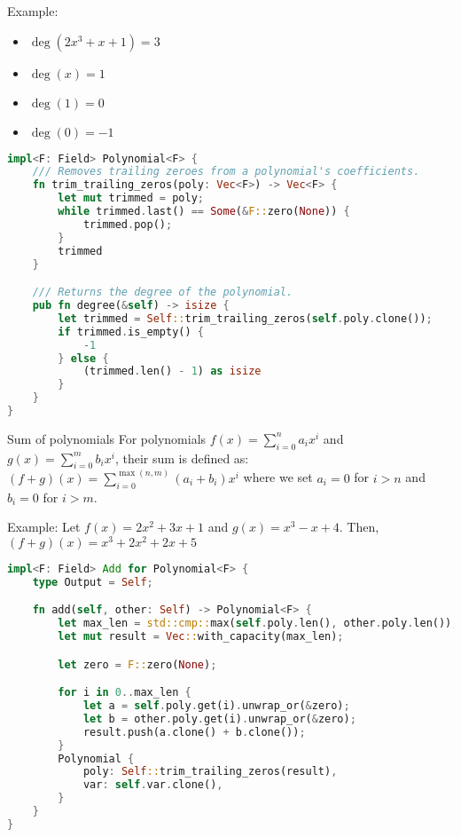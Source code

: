 \documentclass{article}
\begin{document}
Example: 

\begin{itemize}
    \item $\deg(2x^3 + x + 1) = 3$
    \item $\deg(x) = 1$
    \item $\deg(1) = 0$
    \item $\deg(0) = -1$
\end{itemize}

\begin{lstlisting}[language=Rust, caption=Degree of Polynomials]
impl<F: Field> Polynomial<F> {
    /// Removes trailing zeroes from a polynomial's coefficients.
    fn trim_trailing_zeros(poly: Vec<F>) -> Vec<F> {
        let mut trimmed = poly;
        while trimmed.last() == Some(&F::zero(None)) {
            trimmed.pop();
        }
        trimmed
    }

    /// Returns the degree of the polynomial.
    pub fn degree(&self) -> isize {
        let trimmed = Self::trim_trailing_zeros(self.poly.clone());
        if trimmed.is_empty() {
            -1
        } else {
            (trimmed.len() - 1) as isize
        }
    }
}
\end{lstlisting}

\begin{definition}{Sum of polynomials}{}
    For polynomials $f(x) = \sum_{i=0}^n a_i x^i$ and $g(x) = \sum_{i=0}^m b_i x^i$, their sum is defined as:
    $(f + g)(x) = \sum_{i=0}^{\max(n,m)} (a_i + b_i) x^i$
    where we set $a_i = 0$ for $i > n$ and $b_i = 0$ for $i > m$.
\end{definition}

Example: Let $f(x) = 2x^2 + 3x + 1$ and $g(x) = x^3 - x + 4$. Then, $(f + g)(x) = x^3 + 2x^2 + 2x + 5$

\begin{lstlisting}[language=Rust, caption=Sum of Polynomials]
impl<F: Field> Add for Polynomial<F> {
    type Output = Self;

    fn add(self, other: Self) -> Polynomial<F> {
        let max_len = std::cmp::max(self.poly.len(), other.poly.len());
        let mut result = Vec::with_capacity(max_len);

        let zero = F::zero(None);

        for i in 0..max_len {
            let a = self.poly.get(i).unwrap_or(&zero);
            let b = other.poly.get(i).unwrap_or(&zero);
            result.push(a.clone() + b.clone());
        }
        Polynomial {
            poly: Self::trim_trailing_zeros(result),
            var: self.var.clone(),
        }
    }
}
\end{lstlisting}
\end{document}

